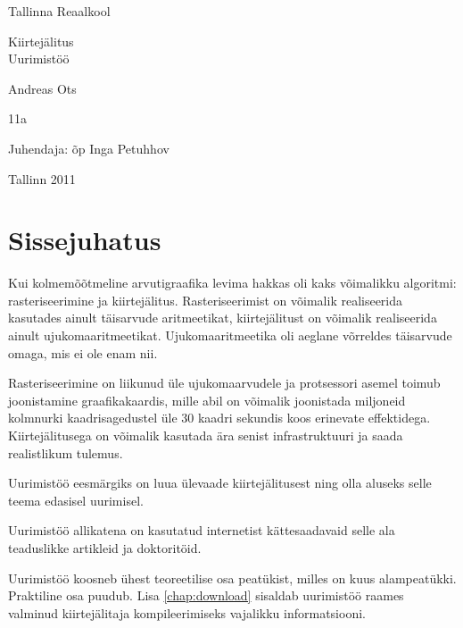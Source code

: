 \documentclass[a4paper,12pt]{report}
\begin{document}
\begin{center}
Tallinna Reaalkool

\vfill

Kiirtejälitus\\
Uurimistöö

\vfill

\end{center}

\begin{raggedleft}

Andreas Ots

11a

Juhendaja: õp Inga Petuhhov

\end{raggedleft}

\vfill

\begin{center}

Tallinn 2011

\end{center}
\clearpage

\tableofcontents
\listoffigures

\chapter*{Sissejuhatus}
\thispagestyle{empty}
Kui kolmemõõtmeline arvutigraafika levima hakkas oli kaks võimalikku
algoritmi: rasteriseerimine ja kiirtejälitus. Rasteriseerimist on võimalik
realiseerida kasutades ainult täisarvude aritmeetikat, kiirtejälitust on
võimalik realiseerida ainult ujukomaaritmeetikat. Ujukomaaritmeetika oli
aeglane võrreldes täisarvude omaga, mis ei ole enam nii. 

Rasteriseerimine on liikunud üle ujukomaarvudele ja protsessori asemel
toimub joonistamine graafikakaardis, mille abil on võimalik joonistada
miljoneid kolmnurki kaadrisagedustel üle 30 kaadri sekundis koos erinevate
effektidega. Kiirtejälitusega on võimalik kasutada ära senist infrastruktuuri
ja saada realistlikum tulemus.

Uurimistöö eesmärgiks on luua ülevaade kiirtejälitusest ning olla aluseks
selle teema edasisel uurimisel.

Uurimistöö allikatena on kasutatud internetist kättesaadavaid selle ala
teaduslikke artikleid ja doktoritöid.

Uurimistöö koosneb ühest teoreetilise osa peatükist, milles on kuus
alampeatükki. Praktiline osa puudub. Lisa \ref{chap:download} sisaldab
uurimistöö raames valminud kiirtejälitaja kompileerimiseks vajalikku
informatsiooni.
\end{document}
